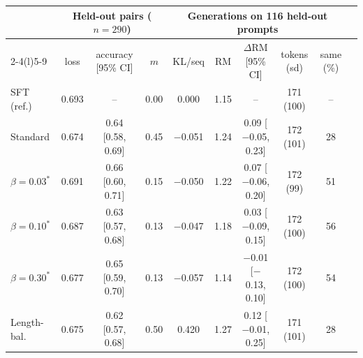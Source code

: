 \begin{tabular}{@{}lccccccccc@{}}
\toprule
 & \multicolumn{3}{c}{Held-out pairs ($n=290$)} & \multicolumn{5}{c}{Generations on 116 held-out prompts} \\
\cmidrule(lr){2-4}\cmidrule(l){5-9}
 & loss & accuracy [95\% CI] & $m$ & KL/seq & RM & $\Delta$RM [95\% CI] & tokens (sd) & same (\%) \\
\midrule
SFT (ref.) & 0.693 & -- & 0.00 & 0.000 & 1.15 & -- & 171 (100) & -- \\
Standard & 0.674 & 0.64 [0.58, 0.69] & 0.45 & $-$0.051 & 1.24 & 0.09 [$-$0.05, 0.23] & 172 (101) & 28 \\
$\beta=0.03^\ast$ & 0.691 & 0.66 [0.60, 0.71] & 0.15 & $-$0.050 & 1.22 & 0.07 [$-$0.06, 0.20] & 172 (99) & 51 \\
$\beta=0.10^\ast$ & 0.687 & 0.63 [0.57, 0.68] & 0.13 & $-$0.047 & 1.18 & 0.03 [$-$0.09, 0.15] & 172 (100) & 56 \\
$\beta=0.30^\ast$ & 0.677 & 0.65 [0.59, 0.70] & 0.13 & $-$0.057 & 1.14 & $-$0.01 [$-$0.13, 0.10] & 172 (100) & 54 \\
\midrule
Length-bal. & 0.675 & 0.62 [0.57, 0.68] & 0.50 & 0.420 & 1.27 & 0.12 [$-$0.01, 0.25] & 171 (101) & 28 \\
\bottomrule
\end{tabular}
